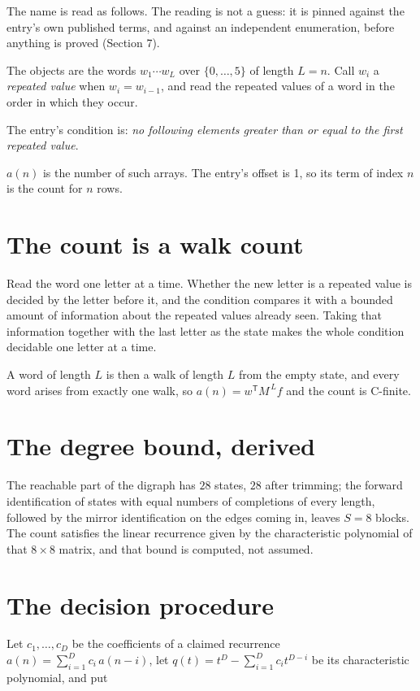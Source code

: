 \documentclass[11pt]{article}
\theoremstyle{definition}
\begin{document}
The name is read as follows. The reading is not a guess: it is pinned against the entry's own published terms, and against an independent enumeration, before anything is proved (Section 7).

The objects are the words $w_1\cdots w_L$ over $\{0,\dots,5\}$ of length $L = n$. Call $w_i$ a {\itshape repeated value} when $w_i = w_{i-1}$, and read the repeated values of a word in the order in which they occur.

The entry's condition is: {\itshape no following elements greater than or equal to the first repeated value}.

$a(n)$ is the number of such arrays. The entry's offset is 1, so its term of index $n$ is the count for $n$ rows.

\section{The count is a walk count}

Read the word one letter at a time. Whether the new letter is a repeated value is decided by the letter before it, and the condition compares it with a bounded amount of information about the repeated values already seen. Taking that information together with the last letter as the state makes the whole condition decidable one letter at a time.

A word of length $L$ is then a walk of length $L$ from the empty state, and every word arises from exactly one walk, so $a(n) = w^{\mathsf T}M^{\,L}f$ and the count is C-finite.

\section{The degree bound, derived}

The reachable part of the digraph has $28$ states, $28$ after trimming; the forward identification of states with equal numbers of completions of every length, followed by the mirror identification on the edges coming in, leaves $S = 8$ blocks. The count satisfies the linear recurrence given by the characteristic polynomial of that $8\times8$ matrix, and that bound is computed, not assumed.

\section{The decision procedure}

Let $c_1,\dots,c_D$ be the coefficients of a claimed recurrence $a(n) = \sum_{i=1}^{D} c_i\,a(n-i)$, let $q(t) = t^{D} - \sum_{i=1}^{D} c_i t^{D-i}$ be its characteristic polynomial, and put
\end{document}
